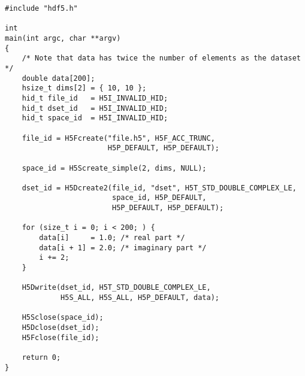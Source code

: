 \documentclass[../HDF5_RFC.tex]{subfiles}
\begin{document}
\begin{verbatim}
#include "hdf5.h"

int
main(int argc, char **argv)
{
    /* Note that data has twice the number of elements as the dataset */
    double data[200];
    hsize_t dims[2] = { 10, 10 };
    hid_t file_id   = H5I_INVALID_HID;
    hid_t dset_id   = H5I_INVALID_HID;
    hid_t space_id  = H5I_INVALID_HID;

    file_id = H5Fcreate("file.h5", H5F_ACC_TRUNC,
                        H5P_DEFAULT, H5P_DEFAULT);

    space_id = H5Screate_simple(2, dims, NULL);

    dset_id = H5Dcreate2(file_id, "dset", H5T_STD_DOUBLE_COMPLEX_LE,
                         space_id, H5P_DEFAULT,
                         H5P_DEFAULT, H5P_DEFAULT);

    for (size_t i = 0; i < 200; ) {
        data[i]     = 1.0; /* real part */
        data[i + 1] = 2.0; /* imaginary part */
        i += 2;
    }

    H5Dwrite(dset_id, H5T_STD_DOUBLE_COMPLEX_LE,
             H5S_ALL, H5S_ALL, H5P_DEFAULT, data);

    H5Sclose(space_id);
    H5Dclose(dset_id);
    H5Fclose(file_id);

    return 0;
}
\end{verbatim}
\end{document}
